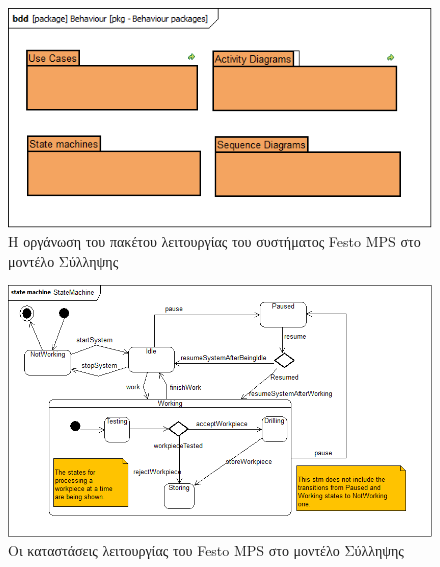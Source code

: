 \documentclass[a4paper,12pt,twoside]{report}
\begin{document}
{\begin{appendices}
			\clearpage
				\begin{figure}[hp]
					\centering
					\includegraphics[scale=0.60]{ConceptionalModel_pkg-Behaviourpackages.png}
					\caption{Η οργάνωση του πακέτου λειτουργίας του συστήματος Festo MPS στο μοντέλο Σύλληψης}
					\label{φωτ: οργάνωση του πακέτου λειτουργίας του συστήματος Festo MPS στο μοντέλο Σύλληψης}
				\end{figure}
				\begin{figure}[hp]
					\centering
					\includegraphics[scale=0.45]{ConceptionalModel_stm-SystemsTopLevelStateMachines.png}
					\caption{Οι καταστάσεις λειτουργίας του Festo MPS στο μοντέλο Σύλληψης}
					\label{φωτ:Οι καταστάσεις λειτουργίας του Festo MPS στο μοντέλο Σύλληψης}
				\end{figure}
				\begin{figure}[hp]
					\centering

\end{figure}
\end{appendices}}
\end{document}
